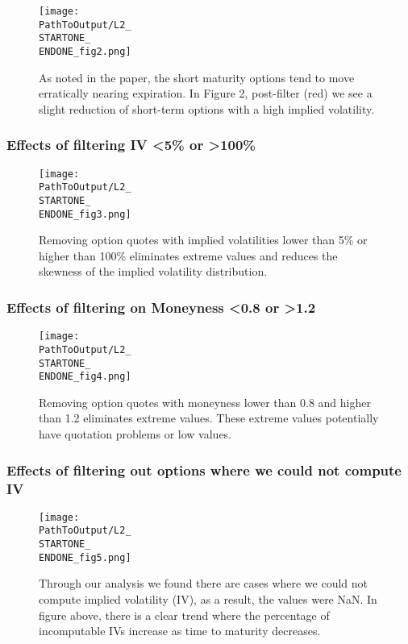 \begin{appendix}
\begin{figure}[H] %
  \centering
  \texttt{[image: \\PathToOutput/L2\_\\STARTONE\_\\ENDONE\_fig2.png]}%
\captionsetup{font=normalfont}
  \caption{As noted in the paper, the short maturity options tend to move erratically nearing expiration. In Figure 2, post-filter (red) we see a slight reduction of short-term options with a high implied volatility.}
\label{fig:time1lvl2fig2}
\end{figure}

\subsubsection{Effects of filtering IV <5\% or >100\%}
\begin{figure}[H] %
  \centering
{}
  \texttt{[image: \\PathToOutput/L2\_\\STARTONE\_\\ENDONE\_fig3.png]}%
\captionsetup{font=normalfont}
  \caption{Removing option quotes with implied volatilities lower than 5\% or higher than 100\% eliminates extreme values and reduces the skewness of the implied volatility distribution.}
\label{fig:time1lvl2fig3}
\end{figure}


\subsubsection{Effects of filtering on Moneyness <0.8 or >1.2}
\begin{figure}[H] %
  \centering
{}
  \texttt{[image: \\PathToOutput/L2\_\\STARTONE\_\\ENDONE\_fig4.png]}%
\captionsetup{font=normalfont}
  \caption{Removing option quotes with moneyness lower than 0.8 and higher than 1.2 eliminates extreme values. These extreme values potentially have quotation problems or low values.}
  \label{fig:time1lvl2fig4}
\end{figure}


\subsubsection{Effects of filtering out options where we could not compute IV}
\begin{figure}[H] %
  \centering
{}
  \texttt{[image: \\PathToOutput/L2\_\\STARTONE\_\\ENDONE\_fig5.png]}%
\captionsetup{font=normalfont}
  \caption{Through our analysis we found there are cases where we could not compute implied volatility (IV), as a result, the values were NaN. In figure above, there is a clear trend where the percentage of incomputable IVs increase as time to maturity decreases.}
 \label{fig:time1lvl2fig5}
\end{figure}





\end{appendix}
